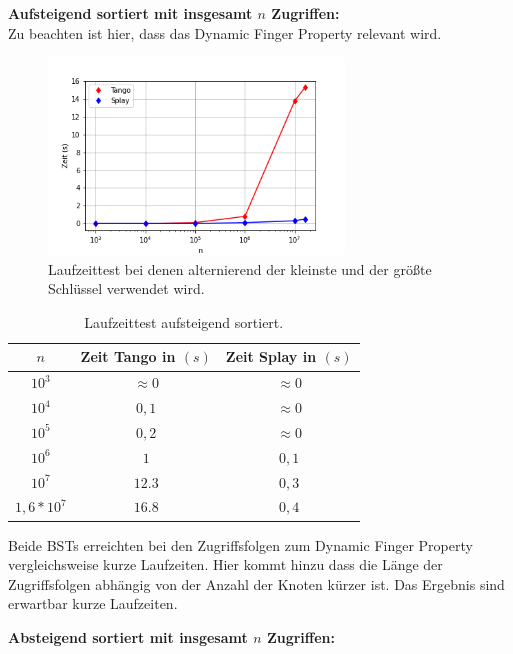 \documentclass[a4paper,12pt]{article}
\begin{document}
 \bigskip

\noindent \textbf{Aufsteigend sortiert mit insgesamt $n$ Zugriffen:}\\
\bigskip
Zu beachten ist hier, dass das Dynamic Finger Property relevant wird. 

\begin{figure}[H]
	\centering
	\includegraphics[width=0.7\textwidth]{"Medien/laufzeittest/diagramm/sorted1"}
	\caption{Laufzeittest bei denen alternierend der kleinste und der größte Schlüssel verwendet wird.}
\end{figure}
\begin{table}[H]
	\begin{center}
		\begin{tabular}[c]{|c|c|c|}
			\hline
			$n$ & Zeit Tango in $\left(s\right)$ &Zeit Splay in $\left(s\right)$ \\
			\hline
			$10^3$ & $\approx 0$ &$\approx 0$ \\
			\hline
			$10^4$  & $0,1$ &$\approx 0$  \\
			\hline
			$10^5$  & $0,2$ &$\approx 0$  \\
			\hline
			$10^6$  & $1$ &$0,1$  \\
			\hline
			$10^7$  & $12.3$ &$0,3$  \\
			\hline
			$1,6 *10^7$  & $16.8$ &$0,4$  \\
			\hline
		\end{tabular}
		\caption{Laufzeittest aufsteigend sortiert.} 
	\end{center}
\end{table}
\noindent Beide BSTs erreichten bei den Zugriffsfolgen zum Dynamic Finger Property  vergleichsweise kurze Laufzeiten. Hier kommt hinzu dass die Länge der Zugriffsfolgen abhängig von der Anzahl der Knoten kürzer ist. Das Ergebnis sind erwartbar kurze Laufzeiten.
\newpage

\bigskip
\noindent \textbf{Absteigend sortiert mit insgesamt $n$ Zugriffen:\\}
\end{document}
